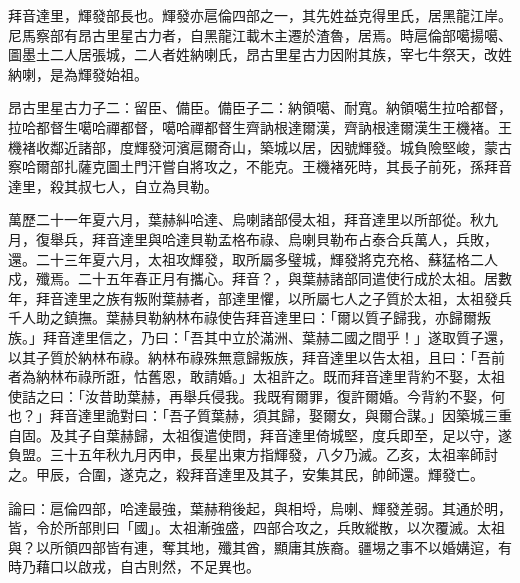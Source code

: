 \begin{pinyinscope}
拜音達里，輝發部長也。輝發亦扈倫四部之一，其先姓益克得里氏，居黑龍江岸。尼馬察部有昂古里星古力者，自黑龍江載木主遷於渣魯，居焉。時扈倫部噶揚噶、圖墨土二人居張城，二人者姓納喇氏，昂古里星古力因附其族，宰七牛祭天，改姓納喇，是為輝發始祖。

昂古里星古力子二：留臣、備臣。備臣子二：納領噶、耐寬。納領噶生拉哈都督，拉哈都督生噶哈禪都督，噶哈禪都督生齊訥根達爾漢，齊訥根達爾漢生王機褚。王機褚收鄰近諸部，度輝發河濱扈爾奇山，築城以居，因號輝發。城負險堅峻，蒙古察哈爾部扎薩克圖土門汗嘗自將攻之，不能克。王機褚死時，其長子前死，孫拜音達里，殺其叔七人，自立為貝勒。

萬歷二十一年夏六月，葉赫糾哈達、烏喇諸部侵太祖，拜音達里以所部從。秋九月，復舉兵，拜音達里與哈達貝勒孟格布祿、烏喇貝勒布占泰合兵萬人，兵敗，還。二十三年夏六月，太祖攻輝發，取所屬多璧城，輝發將克充格、蘇猛格二人戍，殲焉。二十五年春正月有攜心。拜音？，與葉赫諸部同遣使行成於太祖。居數年，拜音達里之族有叛附葉赫者，部達里懼，以所屬七人之子質於太祖，太祖發兵千人助之鎮撫。葉赫貝勒納林布祿使告拜音達里曰：「爾以質子歸我，亦歸爾叛族。」拜音達里信之，乃曰：「吾其中立於滿洲、葉赫二國之間乎！」遂取質子還，以其子質於納林布祿。納林布祿殊無意歸叛族，拜音達里以告太祖，且曰：「吾前者為納林布祿所誑，怙舊恩，敢請婚。」太祖許之。既而拜音達里背約不娶，太祖使詰之曰：「汝昔助葉赫，再舉兵侵我。我既宥爾罪，復許爾婚。今背約不娶，何也？」拜音達里詭對曰：「吾子質葉赫，須其歸，娶爾女，與爾合謀。」因築城三重自固。及其子自葉赫歸，太祖復遣使問，拜音達里倚城堅，度兵即至，足以守，遂負盟。三十五年秋九月丙申，長星出東方指輝發，八夕乃滅。乙亥，太祖率師討之。甲辰，合圍，遂克之，殺拜音達里及其子，安集其民，帥師還。輝發亡。

論曰：扈倫四部，哈達最強，葉赫稍後起，與相埒，烏喇、輝發差弱。其通於明，皆，令於所部則曰「國」。太祖漸強盛，四部合攻之，兵敗縱散，以次覆滅。太祖與？以所領四部皆有連，奪其地，殲其酋，顯庸其族裔。疆埸之事不以婚媾逭，有時乃藉口以啟戎，自古則然，不足異也。


\end{pinyinscope}